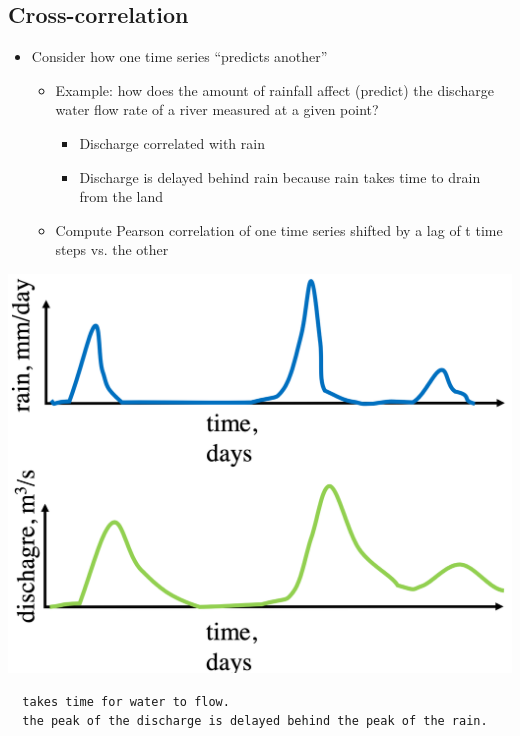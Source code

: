 \documentclass[11pt]{article}
\theoremstyle{definition}
\begin{document}
\subsection{Cross-correlation}
\begin{itemize}
  \item Consider how one time
  series “predicts another”
  \begin{itemize}
    \item Example: how does the
    amount of rainfall affect
    (predict) the discharge water
    flow rate of a river measured
    at a given point?
    \begin{itemize}
      \item Discharge correlated with rain
      \item Discharge is delayed behind
      rain because rain takes time
      to drain from the land
    \end{itemize}
   \item  Compute Pearson
   correlation of one time
   series shifted by a lag of t
   time steps vs. the other
  \end{itemize}
\end{itemize}

\includegraphics[width=\textwidth/2]{10.png}

\begin{verbatim}
  takes time for water to flow. 
  the peak of the discharge is delayed behind the peak of the rain.
\end{verbatim}
\end{document}
